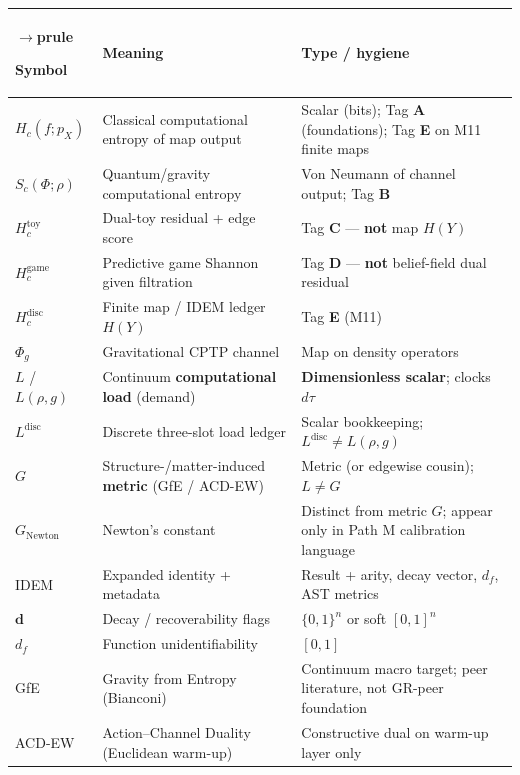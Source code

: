 \documentclass[
  11pt,
]{article}
\newcounter{none} %
\begin{document}
{\def\LTcaptype{none} %
\begin{longtable}[]{@{}
  >{\raggedright\arraybackslash}p{}
  >{\raggedright\arraybackslash}p{}
  >{\raggedright\arraybackslash}p{}@{}}
$\rightarrow$prule\noalign{}
\begin{minipage}[b]{\linewidth}\raggedright
Symbol
\end{minipage} & \begin{minipage}[b]{\linewidth}\raggedright
Meaning
\end{minipage} & \begin{minipage}[b]{\linewidth}\raggedright
Type / hygiene
\end{minipage} \\
\midrule\noalign{}
\endhead
\bottomrule\noalign{}
\endlastfoot
\(H_c(f;p_X)\) & Classical computational entropy of map output & Scalar (bits); Tag \textbf{A} (foundations); Tag \textbf{E} on M11 finite maps \\
\(S_c(\Phi;\rho)\) & Quantum/gravity computational entropy & Von Neumann of channel output; Tag \textbf{B} \\
\(H_c^{\mathrm{toy}}\) & Dual-toy residual + edge score & Tag \textbf{C} --- \textbf{not} map \(H(Y)\) \\
\(H_c^{\mathrm{game}}\) & Predictive game Shannon given filtration & Tag \textbf{D} --- \textbf{not} belief-field dual residual \\
\(H_c^{\mathrm{disc}}\) & Finite map / IDEM ledger \(H(Y)\) & Tag \textbf{E} (M11) \\
\(\Phi_g\) & Gravitational CPTP channel & Map on density operators \\
\(L\) / \(L(\rho,g)\) & Continuum \textbf{computational load} (demand) & \textbf{Dimensionless scalar}; clocks \(d\tau\) \\
\(L^{\mathrm{disc}}\) & Discrete three-slot load ledger & Scalar bookkeeping; \(L^{\mathrm{disc}}\neq L(\rho,g)\) \\
\(G\) & Structure-/matter-induced \textbf{metric} (GfE / ACD-EW) & Metric (or edgewise cousin); \textbf{\(L\neq G\)} \\
\(G_{\mathrm{Newton}}\) & Newton's constant & Distinct from metric \(G\); appear only in Path M calibration language \\
IDEM & Expanded identity + metadata & Result + arity, decay vector, \(d_f\), AST metrics \\
\(\mathbf{d}\) & Decay / recoverability flags & \(\{0,1\}^n\) or soft \([0,1]^n\) \\
\(d_f\) & Function unidentifiability & \([0,1]\) \\
GfE & Gravity from Entropy (Bianconi) & Continuum macro target; peer literature, not GR-peer foundation \\
ACD-EW & Action--Channel Duality (Euclidean warm-up) & Constructive dual on warm-up layer only \\
\end{longtable}
}
\end{document}
